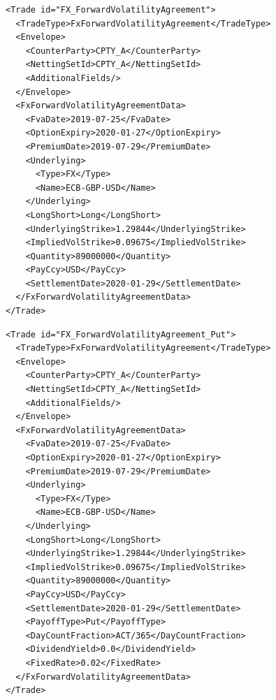 \begin{listing}[H]
\begin{verbatim}
<Trade id="FX_ForwardVolatilityAgreement">
  <TradeType>FxForwardVolatilityAgreement</TradeType>
  <Envelope>
    <CounterParty>CPTY_A</CounterParty>
    <NettingSetId>CPTY_A</NettingSetId>
    <AdditionalFields/>
  </Envelope>
  <FxForwardVolatilityAgreementData>
    <FvaDate>2019-07-25</FvaDate>
    <OptionExpiry>2020-01-27</OptionExpiry>
    <PremiumDate>2019-07-29</PremiumDate>
    <Underlying>
      <Type>FX</Type>
      <Name>ECB-GBP-USD</Name>
    </Underlying>
    <LongShort>Long</LongShort>
    <UnderlyingStrike>1.29844</UnderlyingStrike>
    <ImpliedVolStrike>0.09675</ImpliedVolStrike>
    <Quantity>89000000</Quantity>
    <PayCcy>USD</PayCcy>
    <SettlementDate>2020-01-29</SettlementDate>
  </FxForwardVolatilityAgreementData>
</Trade>
\end{verbatim}
\caption{FX Forward Volatility Agreement data (Straddle payoff)}
\label{lst:fva_data}
\end{listing}

\begin{listing}[H]
\begin{verbatim}
<Trade id="FX_ForwardVolatilityAgreement_Put">
  <TradeType>FxForwardVolatilityAgreement</TradeType>
  <Envelope>
    <CounterParty>CPTY_A</CounterParty>
    <NettingSetId>CPTY_A</NettingSetId>
    <AdditionalFields/>
  </Envelope>
  <FxForwardVolatilityAgreementData>
    <FvaDate>2019-07-25</FvaDate>
    <OptionExpiry>2020-01-27</OptionExpiry>
    <PremiumDate>2019-07-29</PremiumDate>
    <Underlying>
      <Type>FX</Type>
      <Name>ECB-GBP-USD</Name>
    </Underlying>
    <LongShort>Long</LongShort>
    <UnderlyingStrike>1.29844</UnderlyingStrike>
    <ImpliedVolStrike>0.09675</ImpliedVolStrike>
    <Quantity>89000000</Quantity>
    <PayCcy>USD</PayCcy>
    <SettlementDate>2020-01-29</SettlementDate>
    <PayoffType>Put</PayoffType>
    <DayCountFraction>ACT/365</DayCountFraction>
    <DividendYield>0.0</DividendYield>
    <FixedRate>0.02</FixedRate>
  </FxForwardVolatilityAgreementData>
</Trade>
\end{verbatim}
\caption{Forward Volatility Agreement data (Put payoff)}
\label{lst:fva_put_data}
\end{listing}
